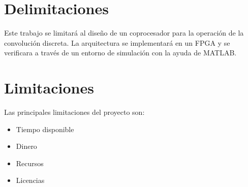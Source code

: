\section{Delimitaciones}
Este trabajo se limitará al diseño de un coprocesador para la operación de la convolución discreta. La arquitectura se implementará en un FPGA y se verificara a través de un entorno de simulación con la ayuda de MATLAB.


\section{Limitaciones}
Las principales limitaciones del proyecto son: 
\begin{itemize}
\item Tiempo disponible
\item Dinero
\item Recursos
\item Licencias
\end{itemize}
